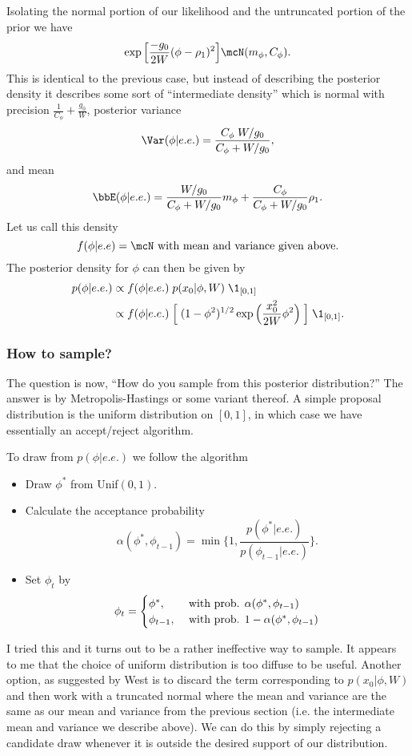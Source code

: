 \documentclass{article}
\begin{document}
Isolating the normal portion of our likelihood and the untruncated portion of the prior we have
\[
\exp \Big[ \frac{-g_0}{2W} (\phi - \rho_1)^2 \Big] \mcN(m_\phi, C_\phi).
\]
This is identical to the previous case, but instead of describing the posterior density it describes some sort of ``intermediate density'' which is normal with precision $\frac{1}{C_\phi} + \frac{g_0}{W}$, posterior variance
\[
\Var(\phi | e.e.) = \frac{C_\phi \; W/g_0}{C_\phi + W/g_0},
\]
and mean
\[
\bbE(\phi | e.e.) = \frac{W/g_0}{C_\phi + W/g_0} m_\phi + \frac{C_\phi}{C_\phi + W/g_0} \rho_1.
\]
Let us call this density
\[
f(\phi | e.e) = \mcN \textmd{ with mean and variance given above.}
\]
The posterior density for $\phi$ can then be given by
\begin{align*}
p(\phi | e.e.) 
& \propto f(\phi | e.e.) \; p(x_0 | \phi, W) \; \1_{[0,1]} \\
& \propto f(\phi | e.e.) \; \Big[ \; (1-\phi^2)^{1/2} \exp \Big( \frac{x_0^2}{2 W} \phi^2 \Big) \; \Big] \; \1_{[0,1]}.
\end{align*}

\subsubsection{How to sample?}

The question is now, ``How do you sample from this posterior distribution?''  The answer is by Metropolis-Hastings or some variant thereof.  A simple proposal distribution is the uniform distribution on $[0,1]$, in which case we have essentially an accept/reject algorithm.

To draw from $p(\phi | e.e.)$ we follow the algorithm
\begin{itemize}
\item Draw $\phi^*$ from Unif$(0,1)$.
\item Calculate the acceptance probability
\[
\alpha(\phi^*, \phi_{t-1}) = \min \Big\{ 1,  \frac{p(\phi^*|e.e.)}{p(\phi_{t-1}|e.e.)} \Big\}.
\]
\item Set $\phi_{t}$ by
\[
\phi_t = 
\begin{cases}
\phi^*, & \textmd{ with prob. } \alpha(\phi^*, \phi_{t-1}) \\
\phi_{t-1}, & \textmd{ with prob. } 1 - \alpha(\phi^*, \phi_{t-1})
\end{cases}
\]
\end{itemize}

I tried this and it turns out to be a rather ineffective way to sample.  It appears to me that the choice of uniform distribution is too diffuse to be useful.  Another option, as suggested by West is to discard the term corresponding to $p(x_0 | \phi, W)$ and then work with a truncated normal where the mean and variance are the same as our mean and variance from the previous section (i.e. the intermediate mean and variance we describe above).  We can do this by simply rejecting a candidate draw whenever it is outside the desired support of our distribution.
\end{document}
